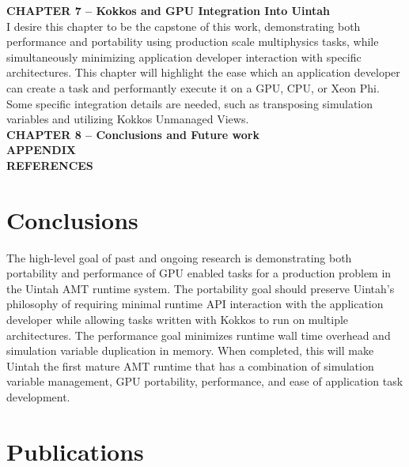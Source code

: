 \documentclass[12pt]{article}
\begin{document}
\textbf{CHAPTER 7 – Kokkos and GPU Integration Into Uintah}\\
I desire this chapter to be the capstone of this work, demonstrating both performance and portability using production scale multiphysics tasks, while simultaneously minimizing application developer interaction with specific architectures.  This chapter will highlight the ease which an application developer can create a task and performantly execute it on a GPU, CPU, or Xeon Phi.  Some specific integration details are needed, such as transposing simulation variables and utilizing Kokkos Unmanaged Views.\\  
\textbf{CHAPTER 8 – Conclusions and Future work}\\
\textbf{APPENDIX}\\
\textbf{REFERENCES}\\


\section{Conclusions}
\label{ch:conclusions}

The high-level goal of past and ongoing research is demonstrating both portability and performance of GPU enabled tasks for a production problem in the Uintah AMT runtime system.  The portability goal should preserve Uintah’s philosophy of requiring minimal runtime API interaction with the application developer while allowing tasks written with Kokkos to run on multiple architectures.  The performance goal minimizes runtime wall time overhead and simulation variable duplication in memory.   When completed, this will make Uintah the first mature AMT runtime that has a combination of simulation variable management, GPU portability, performance, and ease of application task development. 

\section{Publications}
\end{document}
